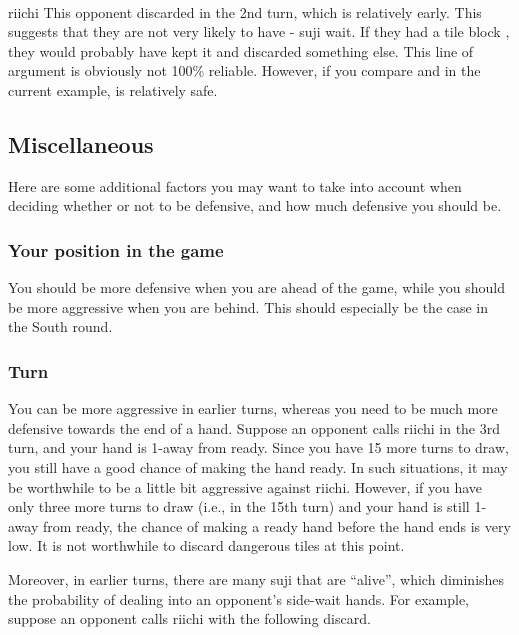 {{\bp
\bei{}\fa{}\\
\hspace{107pt}\footnotesize{riichi}
\ep
This opponent discarded {\LARGE{}} in the 2nd turn, which is relatively early. This suggests that they are not very likely to have {\LARGE{}-} {\jap suji} wait. If they had a tile block {\LARGE{}}, they would probably have kept it and discarded something else. 
This line of argument is obviously not 100\% reliable. However, if you compare {\LARGE{}} and {\LARGE{}} in the current example, {\LARGE{}} is relatively safe. 

\subsection{Miscellaneous}
Here are some additional factors you may want to take into account when deciding whether or not to be defensive, and how much defensive you should be. 

\subsubsection*{Your position in the game}
You should be more defensive when you are ahead of the game, while you should be more aggressive when you are behind. This should especially be the case in the South round. 

\subsubsection*{Turn}
You can be more aggressive in earlier turns, whereas you need to be much more defensive towards the end of a hand. Suppose an opponent calls riichi in the 3rd turn, and your hand is 1-away from ready. Since you have 15 more turns to draw, you still have a good chance of making the hand ready. In such situations, it may be worthwhile to be a little bit aggressive against riichi. 
However, if you have only three more turns to draw (i.e., in the 15th turn) and your hand is still 1-away from ready, the chance of making a ready hand before the hand ends is very low. It is not worthwhile to discard dangerous tiles at this point. 

\bigskip
Moreover, in earlier turns, there are many {\jap suji} that are ``alive'', which diminishes the probability of dealing into an opponent's side-wait hands. For example, suppose an opponent calls riichi with the following discard. 

}}
